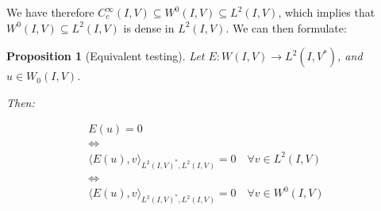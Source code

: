 \documentclass[english,a4paper,12pt,oneside]{scrbook}
\theoremstyle{break}
\newtheorem{prop}[equation]{Proposition}
\theoremstyle{remark}
\begin{document}
We have therefore $C_c^\infty(I,V) \subseteq  W^0(I,V) \subseteq L^2(I,V)$, which implies that $  W^0(I,V)\subseteq L^2(I,V)$ is dense in $L^2(I,V)$. We can then formulate:

\begin{prop}[Equivalent testing]
Let $E: W(I,V)\rightarrow L^2(I,V^*)$, and $u\in W_0(I,V)$.

Then:

\begin{align*}
E(u)=0 \\
\iff \\
\langle E(u), v\rangle_{L^2(I,V)^*, L^2(I,V)}=0 \quad \forall v \in L^2(I,V)\\
\iff \\
\langle E(u), v\rangle_{L^2(I,V)^*, L^2(I,V)}=0 \quad \forall v \in W^0(I,V)
\end{align*}

\end{prop}



\printbibliography[title={Bibliography}]

\end{document}
